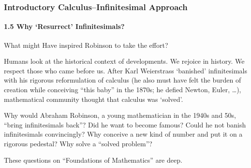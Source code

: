 \begin{frame}
\frametitle{Introductory Calculus--Infinitesimal Approach}
\framesubtitle{1.5 Why `Resurrect' Infinitesimals?}
\label{slide:1.5-03}
What might Have inspired Robinson to take the effort?

Humans look at the historical context of developments. We rejoice in history. We respect those who came before us. After Karl Weierstrass `banished' infinitesimals with his rigorous reformulation of calculus (he also must have felt the burden of creation while conceiving ``this baby'' in the 1870s; he defied Newton, Euler, \dots), mathematical community thought that calculus was `solved'.

Why would Abraham Robinson, a young mathematician in the 1940s and 50s, ``bring infinitesimals back''? Did he want to become famous? Could he not banish infinitesimals convincingly? Why conceive a new kind of number and put it on a rigorous pedestal? Why solve a ``solved problem''?

These questions on ``Foundations of Mathematics'' are deep.
\end{frame}
